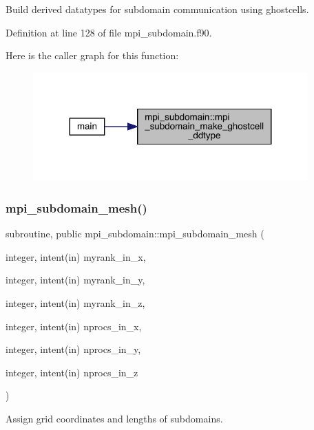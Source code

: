 Build derived datatypes for subdomain communication using ghostcells. 



Definition at line 128 of file mpi\+\_\+subdomain.\+f90.

Here is the caller graph for this function\+:
\nopagebreak
\begin{figure}[H]
\begin{center}
\leavevmode
\includegraphics[width=299pt]{namespacempi__subdomain_ad788c273d92ea7058caf0874bffdad6d_icgraph}
\end{center}
\end{figure}
\mbox{\label{namespacempi__subdomain_a612331eead74041f174ece9a572c7427}} 
\subsubsection{\texorpdfstring{mpi\_subdomain\_mesh()}{mpi\_subdomain\_mesh()}}
{\footnotesize\ttfamily subroutine, public mpi\+\_\+subdomain\+::mpi\+\_\+subdomain\+\_\+mesh (\begin{DoxyParamCaption}\item[{integer, intent(in)}]{myrank\+\_\+in\+\_\+x,  }\item[{integer, intent(in)}]{myrank\+\_\+in\+\_\+y,  }\item[{integer, intent(in)}]{myrank\+\_\+in\+\_\+z,  }\item[{integer, intent(in)}]{nprocs\+\_\+in\+\_\+x,  }\item[{integer, intent(in)}]{nprocs\+\_\+in\+\_\+y,  }\item[{integer, intent(in)}]{nprocs\+\_\+in\+\_\+z }\end{DoxyParamCaption})}



Assign grid coordinates and lengths of subdomains. 


